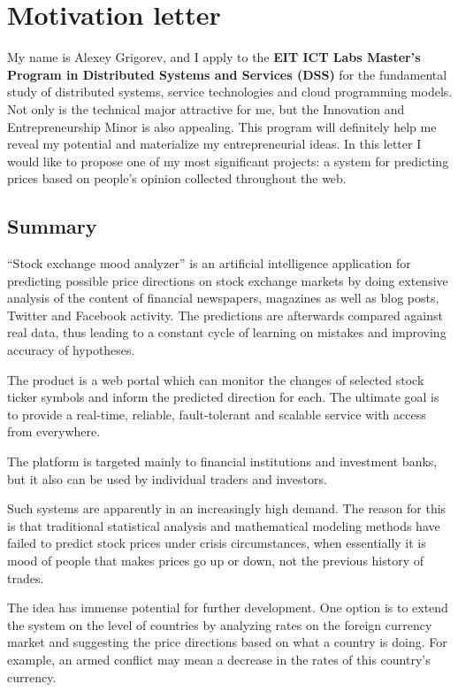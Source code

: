 \documentclass[a4paper,12pt]{article}
\begin{document}
\section*{Motivation letter}

My name is Alexey Grigorev, and I apply to the \textbf{EIT ICT Labs Master's Program in Distributed Systems and Services (DSS)} for the fundamental study of distributed systems, service technologies and cloud programming models. Not only is the technical major attractive for me, but the Innovation and Entrepreneurship Minor is also appealing. This program will definitely help me reveal my potential and materialize my entrepreneurial ideas. In this letter I would like to propose one of my most significant projects: a system for predicting prices based on people's opinion collected throughout the web.

\subsection*{Summary}

``Stock exchange mood analyzer'' is an artificial intelligence application for predicting possible price directions on stock exchange markets by doing extensive analysis of the content of financial newspapers, magazines as well as blog posts, Twitter and Facebook activity. The predictions are afterwards compared against real data, thus leading to a constant cycle of learning on mistakes and improving accuracy of hypotheses.

The product is a web portal which can monitor the changes of selected stock ticker symbols and inform the predicted direction for each. The ultimate goal is to provide a real-time, reliable, fault-tolerant and scalable service with access from everywhere.

The platform is targeted mainly to financial institutions and investment banks, but it also can be used by individual traders and investors.

Such systems are apparently in an increasingly high demand. The reason for this is that traditional statistical analysis and mathematical modeling methods have failed to predict stock prices under crisis circumstances, when essentially it is mood of people that makes prices go up or down, not the previous history of trades.

The idea has immense potential for further development. One option is to extend the system on the level of countries by analyzing rates on the foreign currency market and suggesting the price directions based on what a country is doing. For example, an armed conflict may mean a decrease in the rates of this country's currency.
\end{document}
